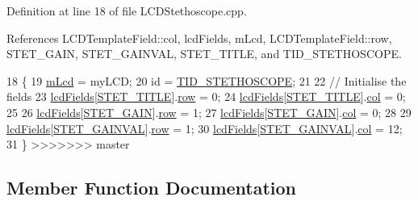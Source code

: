 \begin{DoxyCode}
Definition at line 18 of file L\-C\-D\-Stethoscope.\-cpp.



References L\-C\-D\-Template\-Field\-::col, lcd\-Fields, m\-Lcd, L\-C\-D\-Template\-Field\-::row, S\-T\-E\-T\-\_\-\-G\-A\-I\-N, S\-T\-E\-T\-\_\-\-G\-A\-I\-N\-V\-A\-L, S\-T\-E\-T\-\_\-\-T\-I\-T\-L\-E, and T\-I\-D\-\_\-\-S\-T\-E\-T\-H\-O\-S\-C\-O\-P\-E.


\begin{DoxyCode}
18                                              \{
19   \hyperlink{class_l_c_d_stethoscope_af91304920f29b700ae27aee8aba23ac1}{mLcd} = myLCD;
20   \textcolor{keywordtype}{id} = \hyperlink{_l_c_d_templates_8h_ac3ee9f1dc127335a24c11e2dc3a4c024}{TID\_STETHOSCOPE};
21   
22   \textcolor{comment}{// Initialise the fields}
23   \hyperlink{class_l_c_d_stethoscope_ad36003e685beee5f2268fd4ef1f0db8c}{lcdFields}[\hyperlink{_l_c_d_templates_8h_ad52ae2dd0134d3077ab114f680d349e0}{STET\_TITLE}].\hyperlink{struct_l_c_d_template_field_a842db0224937e139c4ff9f9a6da123e6}{row} = 0;
24   \hyperlink{class_l_c_d_stethoscope_ad36003e685beee5f2268fd4ef1f0db8c}{lcdFields}[\hyperlink{_l_c_d_templates_8h_ad52ae2dd0134d3077ab114f680d349e0}{STET\_TITLE}].\hyperlink{struct_l_c_d_template_field_a5dec4293e8f4f297609c83e8612c3f06}{col} = 0;
25   
26   \hyperlink{class_l_c_d_stethoscope_ad36003e685beee5f2268fd4ef1f0db8c}{lcdFields}[\hyperlink{_l_c_d_templates_8h_ac0f6206db0de9e1c215be9808bf4b1e1}{STET\_GAIN}].\hyperlink{struct_l_c_d_template_field_a842db0224937e139c4ff9f9a6da123e6}{row} = 1;
27   \hyperlink{class_l_c_d_stethoscope_ad36003e685beee5f2268fd4ef1f0db8c}{lcdFields}[\hyperlink{_l_c_d_templates_8h_ac0f6206db0de9e1c215be9808bf4b1e1}{STET\_GAIN}].\hyperlink{struct_l_c_d_template_field_a5dec4293e8f4f297609c83e8612c3f06}{col} = 0;
28   
29   \hyperlink{class_l_c_d_stethoscope_ad36003e685beee5f2268fd4ef1f0db8c}{lcdFields}[\hyperlink{_l_c_d_templates_8h_a99df264a27c8c425105db42a1dbc5fbb}{STET\_GAINVAL}].\hyperlink{struct_l_c_d_template_field_a842db0224937e139c4ff9f9a6da123e6}{row} = 1;
30   \hyperlink{class_l_c_d_stethoscope_ad36003e685beee5f2268fd4ef1f0db8c}{lcdFields}[\hyperlink{_l_c_d_templates_8h_a99df264a27c8c425105db42a1dbc5fbb}{STET\_GAINVAL}].\hyperlink{struct_l_c_d_template_field_a5dec4293e8f4f297609c83e8612c3f06}{col} = 12;
31 \}
>>>>>>> master
\end{DoxyCode}


\subsection{Member Function Documentation}
\hypertarget{class_l_c_d_stethoscope_a2641dd844d4070d6f498ba20c04cdfac}{
}
\end{DoxyCode}
